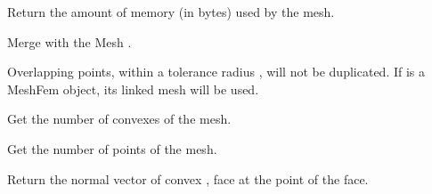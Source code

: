 \documentclass[a4paper,11pt,english]{sphinxmanual}
\begin{document}
\begin{fulllineitems}
\begin{fulllineitems}
\label{\detokenize{python/cmdref_Mesh:getfem.Mesh.memsize}}
Return the amount of memory (in bytes) used by the mesh.

\end{fulllineitems}


\begin{fulllineitems}
\label{\detokenize{python/cmdref_Mesh:getfem.Mesh.merge}}
Merge with the Mesh .

Overlapping points, within a tolerance radius , will not be
duplicated. If  is a MeshFem object, its linked mesh will be used.

\end{fulllineitems}


\begin{fulllineitems}
\label{\detokenize{python/cmdref_Mesh:getfem.Mesh.nbcvs}}
Get the number of convexes of the mesh.

\end{fulllineitems}


\begin{fulllineitems}
\label{\detokenize{python/cmdref_Mesh:getfem.Mesh.nbpts}}
Get the number of points of the mesh.

\end{fulllineitems}


\begin{fulllineitems}
\label{\detokenize{python/cmdref_Mesh:getfem.Mesh.normal_of_face}}
Return the normal vector of convex , face  at the  point of the face.


\end{fulllineitems}
\end{fulllineitems}
\end{document}

